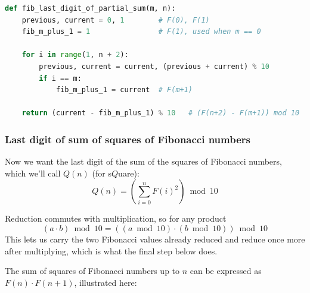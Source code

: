 \medskip

\begin{lstlisting}[language=Python]
def fib_last_digit_of_partial_sum(m, n):
    previous, current = 0, 1        # F(0), F(1)
    fib_m_plus_1 = 1                # F(1), used when m == 0

    for i in range(1, n + 2):
        previous, current = current, (previous + current) % 10
        if i == m:
            fib_m_plus_1 = current  # F(m+1)

    return (current - fib_m_plus_1) % 10   # (F(n+2) - F(m+1)) mod 10
\end{lstlisting}


\bigskip


\subsubsection{Last digit of sum of squares of Fibonacci numbers}

\medskip

Now we want the last digit of the sum of the squares of Fibonacci numbers, which we'll call $Q(n)$ (for s$Q$uare):
\[
Q(n) = \left( \sum\limits_{i=0}^n F(i)^2 \right) \bmod 10
\]

Reduction commutes with multiplication, so for any product
\[
(a \cdot b) \bmod 10 = \left( (a \bmod 10) \cdot (b \bmod 10) \right) \bmod 10
\]
This lets us carry the two Fibonacci values already reduced and reduce once more after multiplying, which is what the final step below does.

\newpage

The sum of squares of Fibonacci numbers up to $n$ can be expressed as $F(n) \cdot F(n+1)$, illustrated here:

\begin{center}
\end{center}

